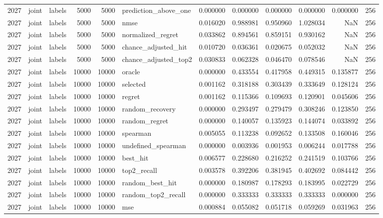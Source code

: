 \begin{tabular}{rllrrlrrrrrr}
2027 & joint & labels & 5000 & 5000 & prediction_above_one & 0.000000 & 0.000000 & 0.000000 & 0.000000 & 0.000000 & 256 \\
2027 & joint & labels & 5000 & 5000 & nmse & 0.016020 & 0.988981 & 0.950960 & 1.028034 & NaN & 256 \\
2027 & joint & labels & 5000 & 5000 & normalized_regret & 0.033862 & 0.894561 & 0.859151 & 0.930162 & NaN & 256 \\
2027 & joint & labels & 5000 & 5000 & chance_adjusted_hit & 0.010720 & 0.036361 & 0.020675 & 0.052032 & NaN & 256 \\
2027 & joint & labels & 5000 & 5000 & chance_adjusted_top2 & 0.030833 & 0.062328 & 0.046470 & 0.078546 & NaN & 256 \\
2027 & joint & labels & 10000 & 10000 & oracle & 0.000000 & 0.433554 & 0.417958 & 0.449315 & 0.135877 & 256 \\
2027 & joint & labels & 10000 & 10000 & selected & 0.001162 & 0.318188 & 0.303439 & 0.333649 & 0.128124 & 256 \\
2027 & joint & labels & 10000 & 10000 & regret & 0.001162 & 0.115366 & 0.109693 & 0.120901 & 0.045606 & 256 \\
2027 & joint & labels & 10000 & 10000 & random_recovery & 0.000000 & 0.293497 & 0.279479 & 0.308246 & 0.123850 & 256 \\
2027 & joint & labels & 10000 & 10000 & random_regret & 0.000000 & 0.140057 & 0.135923 & 0.144074 & 0.033892 & 256 \\
2027 & joint & labels & 10000 & 10000 & spearman & 0.005055 & 0.113238 & 0.092652 & 0.133508 & 0.160046 & 256 \\
2027 & joint & labels & 10000 & 10000 & undefined_spearman & 0.000000 & 0.003936 & 0.001953 & 0.006244 & 0.017788 & 256 \\
2027 & joint & labels & 10000 & 10000 & best_hit & 0.006577 & 0.228680 & 0.216252 & 0.241519 & 0.103766 & 256 \\
2027 & joint & labels & 10000 & 10000 & top2_recall & 0.003578 & 0.392206 & 0.381945 & 0.402692 & 0.084442 & 256 \\
2027 & joint & labels & 10000 & 10000 & random_best_hit & 0.000000 & 0.180987 & 0.178293 & 0.183995 & 0.022729 & 256 \\
2027 & joint & labels & 10000 & 10000 & random_top2_recall & 0.000000 & 0.333333 & 0.333333 & 0.333333 & 0.000000 & 256 \\
2027 & joint & labels & 10000 & 10000 & mse & 0.000884 & 0.055082 & 0.051718 & 0.059269 & 0.031963 & 256 \\

\end{tabular}

